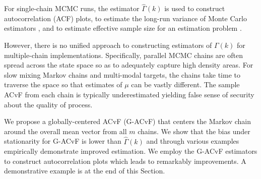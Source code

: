 \documentclass[11pt]{article}
\theoremstyle{remark}
\begin{document}
For single-chain MCMC runs, the estimator $\hat{\Gamma}(k)$ is used to construct autocorrelation (ACF) plots, to estimate the long-run variance of Monte Carlo estimators \cite{hannan:1970,dame:1991}, and to estimate effective sample size for an estimation problem \cite{kass:carlin:gelman:neal:1998,gong:fleg:2016,vats:fleg:jon:2019}. 

However, there is no unified approach to constructing estimators of $\Gamma(k)$ for multiple-chain implementations. Specifically, parallel MCMC chains are often spread across the state space so as to adequately capture high density areas. For slow mixing Markov chains and multi-modal targets, the chains take time to traverse the space so that estimates of $\mu$ can be vastly different. The sample ACvF from each chain is typically underestimated yielding false sense of security about the quality of process.


 We propose a globally-centered ACvF (G-ACvF) that centers the Markov chain around the overall mean vector from all $m$ chains. We show that the bias under stationarity for G-ACvF is lower than $\hat{\Gamma}(k)$ and through various examples empirically demonstrate improved estimation. We employ the G-ACvF estimators to construct autocorrelation plots which leads to remarkably improvements. A demonstrative example is at the end of this Section. 
\end{document}
